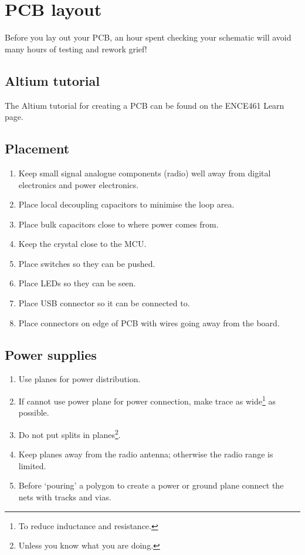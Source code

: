 \chapter{PCB layout}

Before you lay out your PCB, an hour spent checking your schematic
will avoid many hours of testing and rework grief!


\section{Altium tutorial}

The Altium tutorial for creating a PCB can be found on the ENCE461
Learn page.


\label{pcb-recommendations}

\section{Placement}
\label{placement}

\begin{enumerate}
\item
  Keep small signal analogue components (radio) well away from digital
  electronics and power electronics.
\item
  Place local decoupling capacitors to minimise the loop area.
\item
  Place bulk capacitors close to where power comes from.
\item
  Keep the crystal close to the MCU.
\item
  Place switches so they can be pushed.
\item
  Place LEDs so they can be seen.
\item
  Place USB connector so it can be connected to.
\item
  Place connectors on edge of PCB with wires going away from the board.
\end{enumerate}


\section{Power supplies}

\begin{enumerate}
  
\item Use planes for power distribution.

\item If cannot use power plane for power connection, make trace as
  wide\footnote{To reduce inductance and resistance.} as possible.

\item Do not put splits in planes\footnote{Unless you know what you
  are doing.}.

\item Keep planes away from the radio antenna; otherwise the radio
  range is limited.

\item Before `pouring' a polygon to create a power or ground plane
  connect the nets with tracks and vias.
\end{enumerate}


